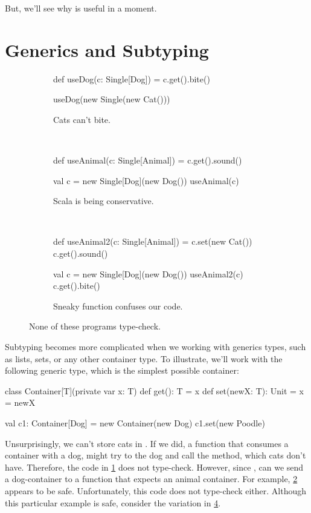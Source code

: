 \documentclass[9pt]{extbook}
\begin{document}
But, we'll see why  is useful in a moment.

\section{Generics and Subtyping}

\begin{figure}
\begin{subfigure}[b]{0.26\textwidth}
\begin{scalacode}
def useDog(c: Single[Dog]) = {
  c.get().bite()
}

useDog(new Single(new Cat()))
\end{scalacode}
\caption{Cats can't bite.}
\label{catdog1}
\end{subfigure}
~\vrule~
\begin{subfigure}[b]{0.33\textwidth}
\begin{scalacode}
def useAnimal(c: Single[Animal]) = {
  c.get().sound()
}

val c = new Single[Dog](new Dog())
useAnimal(c)
\end{scalacode}
\label{catdog2}
\caption{Scala is being conservative.}
\end{subfigure}
~\vrule~
\begin{subfigure}[b]{0.31\textwidth}
\begin{scalacode}
def useAnimal2(c: Single[Animal]) = {
  c.set(new Cat())
  c.get().sound()
}

val c = new Single[Dog](new Dog())
useAnimal2(c)
c.get().bite()
\end{scalacode}
\label{catdog3}
\caption{Sneaky function confuses our code.}
\end{subfigure}
\caption{None of these programs type-check.}
\end{figure}

Subtyping becomes more complicated when we working with generics types, such
as lists, sets, or any other container type. To illustrate, we'll work
with the following generic type, which is the simplest possible container:
%
\begin{scalacode}
class Container[T](private var x: T) {
  def get(): T = x
  def set(newX: T): Unit = x = newX
}

val c1: Container[Dog] = new Container(new Dog)
c1.set(new Poodle)
\end{scalacode}

Unsurprisingly, we can't store cats in . If we did, a function
that consumes a container with a dog, might try to  the
dog and call the  method, which cats don't have.
Therefore, the code in \cref{catdog1} does not type-check.
However, since , can we send a dog-container
to a function that expects an animal container. For example, \cref{catdog2}
appears to be safe. Unfortunately, this code does not type-check either. Although this particular example
is safe, consider the variation in \cref{catdog3}.
\end{document}
